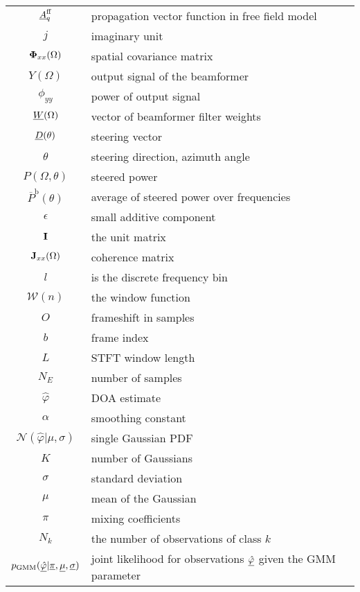 \begin{tabular}{cp{}}

  $\underline{A}_q^{\text{ff}}$   & propagation vector function in free field model \\
  $j$ &  imaginary unit \\
  $\mathbf{\Phi}_{xx}(\Omega)$  & spatial covariance matrix \\
  $Y(\Omega)$           & output signal of the beamformer \\
  $\phi_{yy}$           & power of output signal \\
  $\underline{W}(\Omega)$     & vector of beamformer filter weights \\
  $\underline{D}(\theta)$     & steering vector \\
  $\theta$              & steering direction, azimuth angle   \\
  $P(\Omega,\theta)$ & steered power\\
  $\overline{P}^\text{b}(\theta)$   & average of steered power over frequencies \\
  $\epsilon$            & small additive component \\
  $\mathbf{I}$     & the unit matrix  \\
  $\mathbf{J}_{xx}(\Omega)$     & coherence matrix \\
  $l$     & is the discrete frequency bin \\
  $\mathcal{W}(n)$ & the window function\\
  $O$     & frameshift in samples \\
  $b$     & frame index \\
  $L$     & STFT window length\\
  $N_E$   & number of samples \\
  $\hat \varphi$  & DOA estimate \\
  $\alpha$    & smoothing constant\\
  $\mathcal{N}(\hat{\varphi}|\mu,\sigma)$   & single Gaussian \ac{PDF}\\
  $K$       & number of Gaussians \\
  $\sigma$  & standard deviation \\
  $\mu$     & mean of the Gaussian\\
  $\pi$ & mixing coefficients \\
  $N_k$     & the number of observations of class $k$ \\
  $p_\text{GMM}(\underline{\hat{\varphi}}|\underline{\pi},\underline{\mu},\underline{\sigma}) $  & joint likelihood for observations  $\underline{\hat \varphi}$ given the \acs{GMM} parameter\\

\end{tabular}
